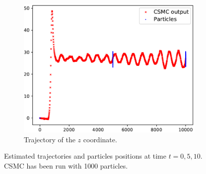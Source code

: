 \documentclass[english, DIV=13]{scrartcl}
\begin{document}
\begin{figure}[h]
\begin{subfigure}{0.49\textwidth}
        \includegraphics[width=\textwidth]{figures/z-trajectory-data}
        \caption{Trajectory of the $z$ coordinate.} 
        \label{fig:z-trajectory-data}
    \end{subfigure}
    \caption{Estimated trajectories and particles positions at time $t=0, 5, 10$.
    CSMC has been run with 1000 particles.}
\end{figure}
\end{document}
